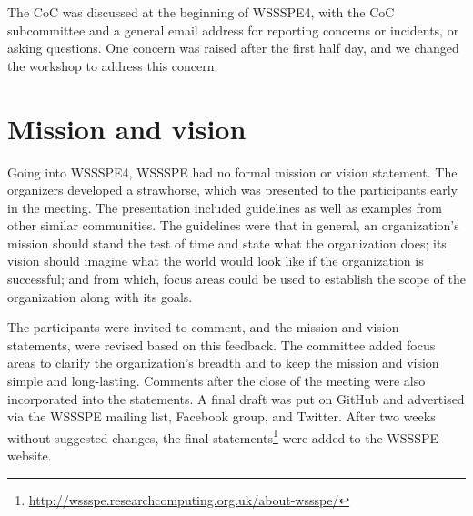 \documentclass[11pt, oneside]{amsart}
\newcommand{\note}[1]{ {\textcolor{blueish}    { ***Note:      #1 }}}
\begin{document}
The CoC was discussed at the beginning of WSSSPE4, with the CoC subcommittee
and a general email address for reporting concerns or incidents, or
asking questions.  One concern was raised after the first half day, 
and we changed the workshop
to address this concern.



\section{Mission and vision}\label{sec:mission}


Going into WSSSPE4, WSSSPE had no formal mission or vision statement.
The organizers developed a strawhorse, which was presented to the participants early in the meeting.
The presentation included guidelines as well as examples from other similar communities.
The guidelines were that in general, an organization's mission should stand the test of time and state what the organization does; its vision should imagine what the world would look like if the organization is successful; and from which, focus areas could be used to establish the scope of the organization along with its goals.

The participants were 
invited to comment,
and 
the mission and vision statements, were revised 
based on this feedback.
The committee added focus areas to clarify the organization's breadth and to keep the mission and vision simple and long-lasting.
Comments after the close of the meeting were also incorporated into the statements.
A final draft was put on GitHub and advertised
via the WSSSPE mailing list, Facebook group, and Twitter.
After two weeks without suggested changes, the final statements\footnote{\url{http://wssspe.researchcomputing.org.uk/about-wssspe/}}
were added
to the WSSSPE website.

\end{document}
